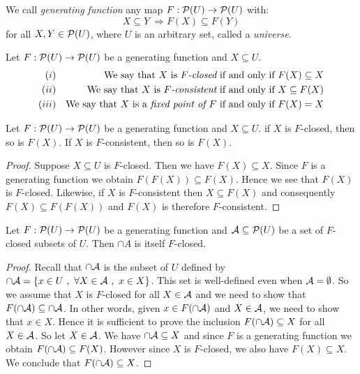 \begin{defin}\label{logic:def:generating:function}
  We call {\em generating function} any map 
  $F:{\cal P}(U)\rightarrow{\cal P}(U)$ with:
  \[
    X\subseteq Y\ \Rightarrow F(X)\subseteq F(Y)
  \]
for all $X,Y\in{\cal P}(U)$, where $U$ is an arbitrary set,
called a {\em universe}.
\end{defin}

\begin{defin}\label{logic:def:genfun:closed:consistent}
  Let $F:{\cal P}(U)\rightarrow{\cal P}(U)$ be a generating function and 
  $X\subseteq U$.
  \begin{eqnarray*}
    (i)&&\mbox{We say that $X$ is {\em $F$-closed} \ifand\ $F(X)\subseteq X$}\\
    (ii)&&\mbox{We say that $X$ is {\em $F$-consistent} \ifand\ 
    $X\subseteq F(X)$}\\
    (iii)&&\mbox{We say that $X$ is a {\em fixed point of $F$} \ifand\ 
    $F(X)=X$}
  \end{eqnarray*}
\end{defin}

\begin{prop}\label{logic:prop:genfun:closed:direct:image}
  Let $F:{\cal P}(U)\rightarrow{\cal P}(U)$ be a generating function and 
  $X\subseteq U$. if $X$ is $F$-closed, then so is $F(X)$. If $X$ is 
  $F$-consistent, then so is $F(X)$.
\end{prop}
\begin{proof}
  Suppose $X\subseteq U$ is $F$-closed. Then we have $F(X)\subseteq X$.
  Since $F$ is a generating function we obtain $F(F(X))\subseteq F(X)$.
  Hence we see that $F(X)$ is $F$-closed. Likewise, if $X$ is $F$-consistent
  then $X\subseteq F(X)$ and consequently $F(X)\subseteq F(F(X))$ and $F(X)$
  is therefore $F$-consistent.
\end{proof}

\begin{prop}\label{logic:prop:genfun:closed:intersect}
  Let $F:{\cal P}(U)\rightarrow{\cal P}(U)$ be a generating function and 
  ${\cal A}\subseteq{\cal P}(U)$ be a set of $F$-closed subsets of $U$. 
  Then $\cap A$ is itself $F$-closed.
\end{prop}
\begin{proof}
  Recall that $\cap{\cal A}$ is the subset of $U$ defined by 
  $\cap{\cal A}=\{x\in U\ ,\ \forall X\in{\cal A}\ ,\ x\in X\}$. This set is
  well-defined even when ${\cal A}=\emptyset$. So we assume that $X$ is 
  $F$-closed for all $X\in{\cal A}$ and we need to show that 
  $F(\cap{\cal A})\subseteq\cap{\cal A}$. In other words, given 
  $x\in F(\cap{\cal A})$ and $X\in{\cal A}$, we need to show that $x\in X$.
  Hence it is sufficient to prove the inclusion $F(\cap{\cal A})\subseteq X$
  for all $X\in{\cal A}$. So let $X\in{\cal A}$. We have 
  $\cap{\cal A}\subseteq X$ and since $F$ is a generating function we obtain
  $F(\cap{\cal A})\subseteq F(X)$. However since $X$ is $F$-closed, we also 
  have $F(X)\subseteq X$. We conclude that $F(\cap{\cal A})\subseteq X$.
\end{proof}

